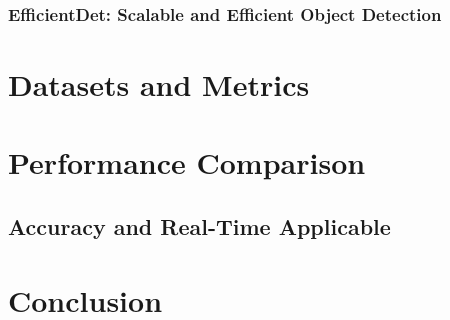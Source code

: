 \documentclass[12pt, oneside]{article}
\begin{document}
\subsubsection{EfficientDet: Scalable and Efficient Object Detection}


\section{Datasets and Metrics}


\section{Performance Comparison}


\subsection{Accuracy and Real-Time Applicable}


\section{Conclusion}


\newpage

\printbibliography
\end{document}
